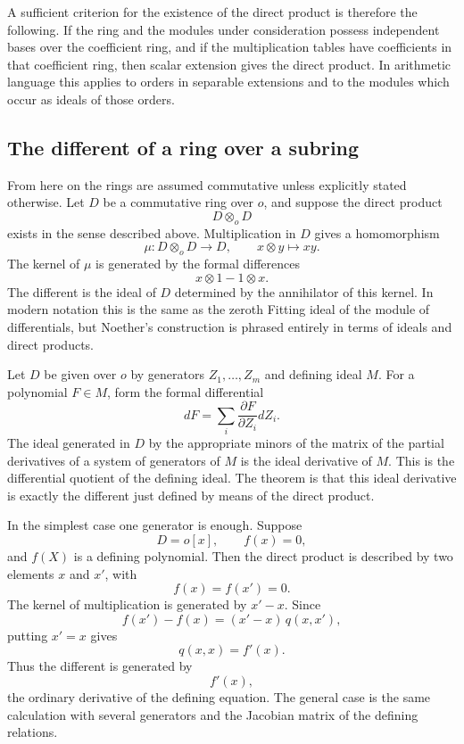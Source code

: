 \documentclass[11pt]{article}
\begin{document}
A sufficient criterion for the existence of the direct product is therefore the following. If the ring and the modules under consideration possess independent bases over the coefficient ring, and if the multiplication tables have coefficients in that coefficient ring, then scalar extension gives the direct product. In arithmetic language this applies to orders in separable extensions and to the modules which occur as ideals of those orders.

\subsection{The different of a ring over a subring}

From here on the rings are assumed commutative unless explicitly stated otherwise. Let \(D\) be a commutative ring over \(o\), and suppose the direct product
\[
  D\otimes_o D
\]
exists in the sense described above. Multiplication in \(D\) gives a homomorphism
\[
  \mu:D\otimes_o D\longrightarrow D,
  \qquad x\otimes y\mapsto xy.
\]
The kernel of \(\mu\) is generated by the formal differences
\[
  x\otimes1-1\otimes x.
\]
The different is the ideal of \(D\) determined by the annihilator of this kernel. In modern notation this is the same as the zeroth Fitting ideal of the module of differentials, but Noether's construction is phrased entirely in terms of ideals and direct products.

Let \(D\) be given over \(o\) by generators \(Z_1,
\ldots,Z_m\) and defining ideal \(M\). For a polynomial \(F\in M\), form the formal differential
\[
  dF=\sum_i \frac{\partial F}{\partial Z_i}
  dZ_i.
\]
The ideal generated in \(D\) by the appropriate minors of the matrix of the partial derivatives of a system of generators of \(M\) is the ideal derivative of \(M\). This is the differential quotient of the defining ideal. The theorem is that this ideal derivative is exactly the different just defined by means of the direct product.

In the simplest case one generator is enough. Suppose
\[
  D=o[x],\qquad f(x)=0,
\]
and \(f(X)\) is a defining polynomial. Then the direct product is described by two elements \(x\) and \(x'\), with
\[
  f(x)=f(x')=0.
\]
The kernel of multiplication is generated by \(x'-x\). Since
\[
  f(x')-f(x)=(x'-x)\,q(x,x'),
\]
putting \(x'=x\) gives
\[
  q(x,x)=f'(x).
\]
Thus the different is generated by
\[
  f'(x),
\]
the ordinary derivative of the defining equation. The general case is the same calculation with several generators and the Jacobian matrix of the defining relations.
\end{document}
